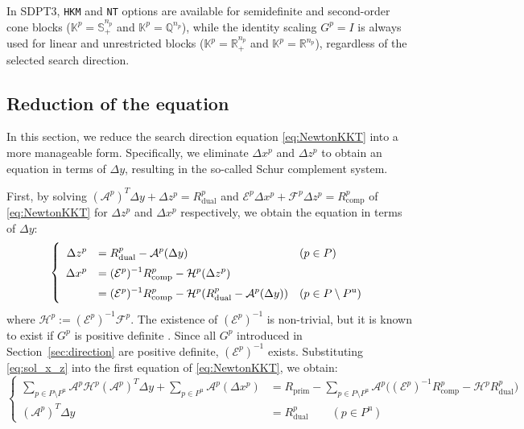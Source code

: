 \medskip 

In SDPT3, \texttt{HKM} and \texttt{NT} options are available for semidefinite and second-order cone blocks ($\mathbb{K}^p = \mathbb{S}^{n_p}_+$ and $\mathbb{K}^p = \mathbb{Q}^{n_p}$), while the identity scaling $G^p = I$ is always used for linear and unrestricted blocks ($\mathbb{K}^p = \mathbb{R}^{n_p}_+$ and $\mathbb{K}^p = \mathbb{R}^{n_p}$), regardless of the selected search direction.


\subsection{Reduction of the equation}
In this section, we reduce the search direction equation \eqref{eq:NewtonKKT} into a more manageable form. 
Specifically, we eliminate $\Delta x^p$ and $\Delta z^p$ to obtain an equation in terms of $\Delta y$, resulting in the so-called Schur complement system.

First, by solving $(\mathcal{A}^p)^T \Delta y + \Delta z^p = R_{\text{dual}}^p$ and $\mathcal{E}^p \Delta x^p + \mathcal{F}^p \Delta z^p = R_{\text{comp}}^p$ of \eqref{eq:NewtonKKT} for $\Delta z^p$ and $\Delta x^p$ respectively, we obtain the equation in terms of $\Delta y$:
\begin{equation}
    \everymath{\displaystyle}
    \renewcommand{\arraystretch}{1.5}
    \left\{
    \begin{array}{rll}
    \Delta z^p &= R_{\text{dual}}^p - \mathcal{A}^p(\Delta y)  & (p\in P)\\
    \Delta x^p &= (\mathcal{E}^p)^{-1}R_{\text{comp}}^p - \mathcal{H}^p(\Delta z^p) \\
               &= (\mathcal{E}^p)^{-1}R_{\text{comp}}^p - \mathcal{H}^p(R_{\text{dual}}^p - \mathcal{A}^p(\Delta y))  & (p\in P\setminus P^{\text{u}})
   \end{array}
   \right.
   \label{eq:sol_x_z}
\end{equation}
where $\mathcal{H}^p := (\mathcal{E}^p)^{-1}\mathcal{F}^p$. 
The existence of $(\mathcal{E}^p)^{-1}$ is non-trivial, but it is known to exist if $G^p$ is positive definite \cite{todd1998}. 
Since all $G^p$ introduced in Section~\ref{sec:direction} are positive definite, $(\mathcal{E}^p)^{-1}$ exists.
Substituting \eqref{eq:sol_x_z} into the first equation of \eqref{eq:NewtonKKT}, we obtain:
\begin{equation}
    \left\{
    \begin{aligned}
        \sum_{p \in P\setminus P^{\text{u}}} \mathcal{A}^p\mathcal{H}^p(\mathcal{A}^p)^T\Delta y + \sum_{p \in P^{\text{u}}} \mathcal{A}^p(\Delta x^p) 
            &= R_{\text{prim}} - \sum_{p \in P\setminus P^{\text{u}}} \mathcal{A}^p \big( (\mathcal{E}^p)^{-1}R_{\text{comp}}^p - \mathcal{H}^p R_{\text{dual}}^p \big) \\
        (\mathcal{A}^p)^T \Delta y 
            &= R^p_{\text{dual}} \qquad (p\in P^{\text{u}})
    \end{aligned}
    \right.
    \label{eq:Schur_complement}
\end{equation}

